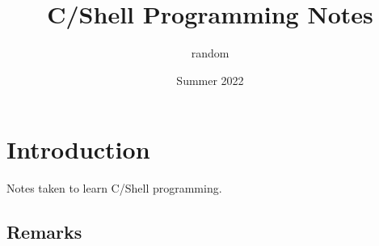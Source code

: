 \documentclass{article}
\begin{document}
\title{C/Shell Programming Notes}
\author{random}
\date{Summer 2022}
\maketitle
\tableofcontents
\section*{Introduction}
Notes taken to learn C/Shell programming.

\subsection*{Remarks}


\end{document}
